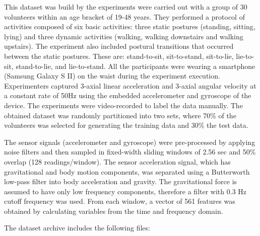 \documentclass[
]{article}
\begin{document}
This dataset was build by the experiments were carried out with a group
of 30 volunteers within an age bracket of 19-48 years. They performed a
protocol of activities composed of six basic activities: three static
postures (standing, sitting, lying) and three dynamic activities
(walking, walking downstairs and walking upstairs). The experiment also
included postural transitions that occurred between the static postures.
These are: stand-to-sit, sit-to-stand, sit-to-lie, lie-to-sit,
stand-to-lie, and lie-to-stand. All the participants were wearing a
smartphone (Samsung Galaxy S II) on the waist during the experiment
execution. Experimenters captured 3-axial linear acceleration and
3-axial angular velocity at a constant rate of 50Hz using the embedded
accelerometer and gyroscope of the device. The experiments were
video-recorded to label the data manually. The obtained dataset was
randomly partitioned into two sets, where 70\% of the volunteers was
selected for generating the training data and 30\% the test data.

The sensor signals (accelerometer and gyroscope) were pre-processed by
applying noise filters and then sampled in fixed-width sliding windows
of 2.56 sec and 50\% overlap (128 readings/window). The sensor
acceleration signal, which has gravitational and body motion components,
was separated using a Butterworth low-pass filter into body acceleration
and gravity. The gravitational force is assumed to have only low
frequency components, therefore a filter with 0.3 Hz cutoff frequency
was used. From each window, a vector of 561 features was obtained by
calculating variables from the time and frequency domain.

The dataset archive includes the following files:
\end{document}
